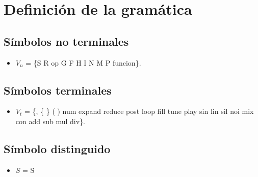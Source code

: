 \documentclass[a4paper]{article}
\begin{document}
\section{Definici\'on de la gram\'atica}

\subsection{Símbolos no terminales}
\begin{itemize}
\item \textbf{$V_n$} = \{S R op G F H I N M P funcion\}.
\end{itemize}


\subsection{Símbolos terminales}
\begin{itemize}
\item \textbf{$V_t$} = \{, \{ \} ( ) num expand reduce post loop fill tune play sin lin sil noi mix con add sub mul div\}.
\end{itemize}

\subsection{Símbolo distinguido}
\begin{itemize}
\item \textbf{$S$} = S 
\end{itemize}
\end{document}

